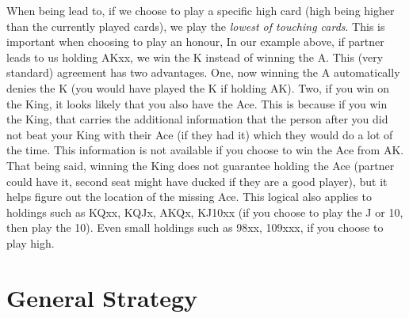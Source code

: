 \documentclass[a4paper]{report}
\theoremstyle{question}
\theoremstyle{theorem}
\theoremstyle{definition}
\newcommand{\<}{\left\langle}%
\renewcommand{\>}{\right\rangle}%
\begin{document}
When being lead to, if we choose to play a specific high card (high being higher than the currently played cards), we play the \textit{lowest of touching cards}. This is important when choosing to play an honour, In our example above, if partner leads to us holding AKxx, we win the K instead of winning the A. This (very standard) agreement has two advantages. One, now winning the A automatically denies the K (you would have played the K if holding AK). Two, if you win on the King, it looks likely that you also have the Ace. This is because if you win the King, that carries the additional information that the person after you did not beat your King with their Ace (if they had it) which they would do a lot of the time. This information is not available if you choose to win the Ace from AK. That being said, winning the King does not guarantee holding the Ace (partner could have it, second seat might have ducked if they are a good player), but it helps figure out the location of the missing Ace. This logical also applies to holdings such as KQxx, KQJx, AKQx, KJ10xx (if you choose to play the J or 10, then play the 10). Even small holdings such as 98xx, 109xxx, if you choose to play high.

























\chapter*{General Strategy}
\end{document}
